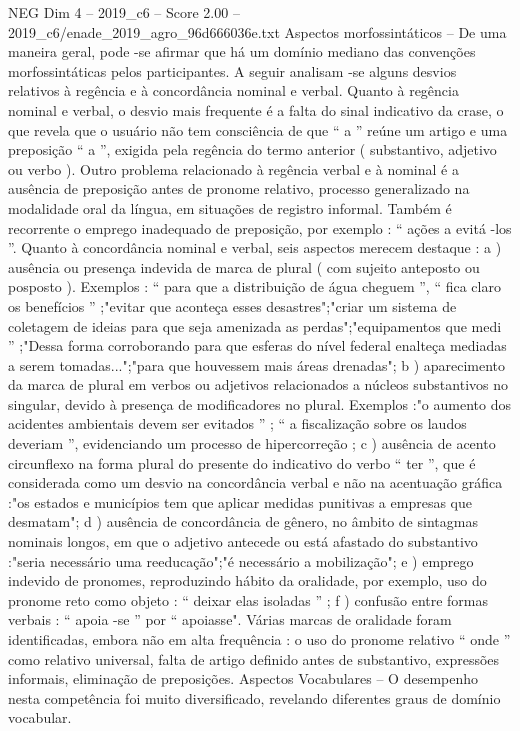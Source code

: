 \begin{textsample}{NEG Dim 4 – 2019\_c6 – Score 2.00 – 2019\_c6/enade\_2019\_agro\_96d666036e.txt}
Aspectos morfossintáticos – De uma maneira geral, pode -se afirmar que há um domínio mediano das convenções morfossintáticas pelos participantes.
A seguir analisam -se alguns desvios relativos à regência e à concordância nominal e verbal.
Quanto à regência nominal e verbal, o desvio mais frequente é a falta do sinal indicativo da crase, o que revela que o usuário não tem consciência de que “ a ” reúne um artigo e uma preposição “ a ”, exigida pela regência do termo anterior ( substantivo, adjetivo ou verbo ).
Outro problema relacionado à regência verbal e à nominal é a ausência de preposição antes de pronome relativo, processo generalizado na modalidade oral da língua, em situações de registro informal.
Também é recorrente o emprego inadequado de preposição, por exemplo : “ ações a evitá -los ”.
Quanto à concordância nominal e verbal, seis aspectos merecem destaque : a ) ausência ou presença indevida de marca de plural ( com sujeito anteposto ou posposto ).
Exemplos : “ para que a distribuição de água cheguem ”, “ fica claro os benefícios ” ;"evitar que aconteça esses desastres";"criar um sistema de coletagem de ideias para que seja amenizada as perdas";"equipamentos que medi ” ;"Dessa forma corroborando para que esferas do nível federal enalteça mediadas a serem tomadas...";"para que houvessem mais áreas drenadas"; b ) aparecimento da marca de plural em verbos ou adjetivos relacionados a núcleos substantivos no singular, devido à presença de modificadores no plural.
Exemplos :"o aumento dos acidentes ambientais devem ser evitados ” ; “ a fiscalização sobre os laudos deveriam ”, evidenciando um processo de hipercorreção ; c ) ausência de acento circunflexo na forma plural do presente do indicativo do verbo “ ter ”, que é considerada como um desvio na concordância verbal e não na acentuação gráfica :"os estados e municípios tem que aplicar medidas punitivas a empresas que desmatam"; d ) ausência de concordância de gênero, no âmbito de sintagmas nominais longos, em que o adjetivo antecede ou está afastado do substantivo :"seria necessário uma reeducação";"é necessário a mobilização"; e ) emprego indevido de pronomes, reproduzindo hábito da oralidade, por exemplo, uso do pronome reto como objeto : “ deixar elas isoladas ” ; f ) confusão entre formas verbais : “ apoia -se ” por “ apoiasse".
Várias marcas de oralidade foram identificadas, embora não em alta frequência : o uso do pronome relativo “ onde ” como relativo universal, falta de artigo definido antes de substantivo, expressões informais, eliminação de preposições.
Aspectos Vocabulares – O desempenho nesta competência foi muito diversificado, revelando diferentes graus de domínio vocabular.

\end{textsample}
